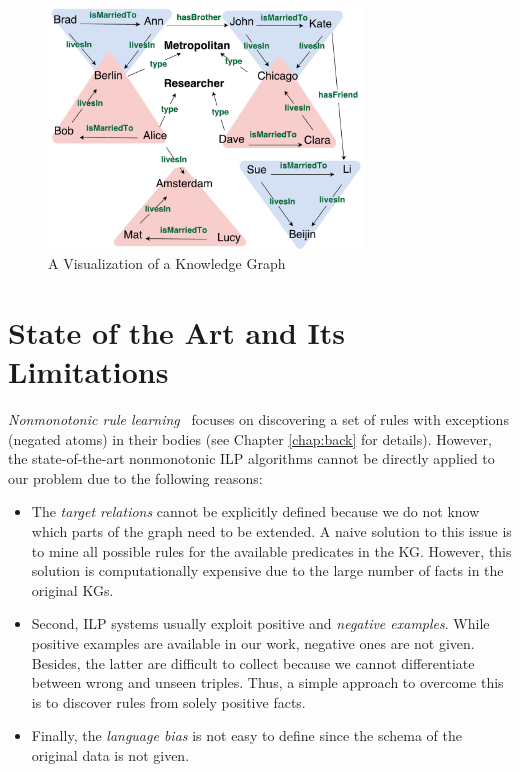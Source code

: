 \begin{figure}[t]
\centering
\includegraphics[width=0.75\textwidth]{figures/kg_advanced_col}
\caption{A Visualization of a Knowledge Graph}
\label{fig1.1}
\end{figure}

\section{State of the Art and Its Limitations}

\textit{Nonmonotonic rule learning}~\cite{ref11, ref40, ref41, ref32, ref42} focuses on discovering a set of rules with exceptions (negated atoms) in their bodies (see Chapter \ref{chap:back} for details). However, the state-of-the-art nonmonotonic ILP algorithms cannot be directly applied to our problem due to the following reasons:
\begin{itemize}
\item The \textit{target relations} cannot be explicitly defined because we do not know which parts of the graph need to be extended. A naive solution to this issue is to mine all possible rules for the available predicates in the KG. However, this solution is computationally expensive due to the large number of facts in the original KGs.
\item Second, ILP systems usually exploit positive and \textit{negative examples}. While positive examples are available in our work, negative ones are not given. Besides, the latter are difficult to collect because we cannot differentiate between wrong and unseen triples. Thus, a simple approach to overcome this is to discover rules from solely positive facts.
\item Finally, the \textit{language bias} is not easy to define since the schema of the original data is not given.
\end{itemize}

